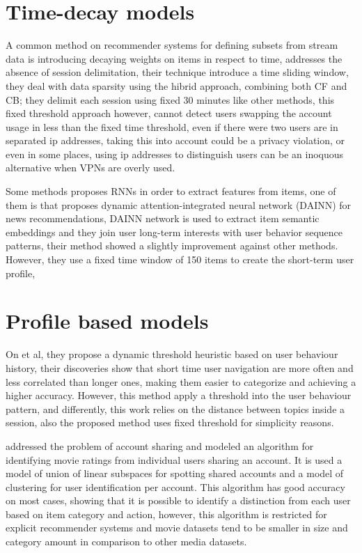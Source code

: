 \documentclass[ecp,tc,english]{iiufrgs}
\begin{document}
\section{Time-decay models}

A common method on recommender systems for defining subsets from stream data is introducing decaying weights on items in respect to time, \cite{sottocornola2018} addresses the absence of session delimitation, their technique introduce a time sliding window, they deal with data sparsity using the hibrid approach, combining both CF and CB; they delimit each session using fixed 30 minutes like other methods, this fixed threshold approach however, cannot detect users swapping the account usage in less than the fixed time threshold, even if there were two users are in separated ip addresses, taking this into account could be a privacy violation, or even in some places, using ip addresses to distinguish users can be an inoquous alternative when VPNs are overly used.

Some methods proposes RNNs in order to extract features from  items, one of them is \cite{zhang2019} that proposes dynamic attention-integrated neural network (DAINN) for news recommendations, DAINN network is used to extract item semantic embeddings and they join user long-term interests with user behavior sequence patterns, their method showed a slightly improvement against other methods. However, they use a fixed time window of 150 items to create the short-term user profile,

\section{Profile based models}

On \cite{jindal2020} et al, they propose a dynamic threshold heuristic based on user behaviour history, their discoveries show that short time user navigation are more often and less correlated than longer ones, making them easier to categorize and achieving a higher accuracy. However, this method apply a threshold into the user behaviour pattern, and differently, this work relies on the distance between topics inside a session, also the proposed method uses fixed threshold for simplicity reasons.

\cite{zhang2012} addressed the problem of account sharing and modeled an algorithm for identifying movie ratings from individual users sharing an account. It is used a model of union of linear subspaces for spotting shared accounts and a model of clustering for user identification per account. This algorithm has good accuracy on most cases, showing that it is possible to identify a distinction from each user based on item category and action, however, this algorithm is restricted for explicit recommender systems and movie datasets tend to be smaller in size and category amount in comparison to other media datasets.
\end{document}
